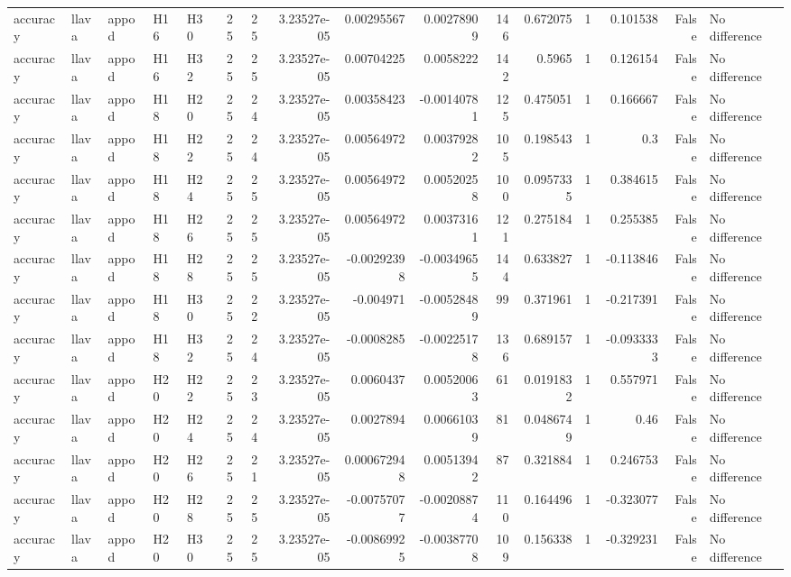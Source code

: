 \begin{longtable}{lllllrrrrrrrrrrl}
accuracy & llava & appod & H16 & H30 & 25 & 25 & 3.23527e-05 & 0.00295567 & 0.00278909 & 146 & 0.672075 & 1 & 0.101538 & False & No difference \\
accuracy & llava & appod & H16 & H32 & 25 & 25 & 3.23527e-05 & 0.00704225 & 0.0058222 & 142 & 0.5965 & 1 & 0.126154 & False & No difference \\
accuracy & llava & appod & H18 & H20 & 25 & 24 & 3.23527e-05 & 0.00358423 & -0.00140781 & 125 & 0.475051 & 1 & 0.166667 & False & No difference \\
accuracy & llava & appod & H18 & H22 & 25 & 24 & 3.23527e-05 & 0.00564972 & 0.00379282 & 105 & 0.198543 & 1 & 0.3 & False & No difference \\
accuracy & llava & appod & H18 & H24 & 25 & 25 & 3.23527e-05 & 0.00564972 & 0.00520258 & 100 & 0.0957335 & 1 & 0.384615 & False & No difference \\
accuracy & llava & appod & H18 & H26 & 25 & 25 & 3.23527e-05 & 0.00564972 & 0.00373161 & 121 & 0.275184 & 1 & 0.255385 & False & No difference \\
accuracy & llava & appod & H18 & H28 & 25 & 25 & 3.23527e-05 & -0.00292398 & -0.00349655 & 144 & 0.633827 & 1 & -0.113846 & False & No difference \\
accuracy & llava & appod & H18 & H30 & 25 & 22 & 3.23527e-05 & -0.004971 & -0.00528489 & 99 & 0.371961 & 1 & -0.217391 & False & No difference \\
accuracy & llava & appod & H18 & H32 & 25 & 24 & 3.23527e-05 & -0.0008285 & -0.00225178 & 136 & 0.689157 & 1 & -0.0933333 & False & No difference \\
accuracy & llava & appod & H20 & H22 & 25 & 23 & 3.23527e-05 & 0.0060437 & 0.00520063 & 61 & 0.0191832 & 1 & 0.557971 & False & No difference \\
accuracy & llava & appod & H20 & H24 & 25 & 24 & 3.23527e-05 & 0.0027894 & 0.00661039 & 81 & 0.0486749 & 1 & 0.46 & False & No difference \\
accuracy & llava & appod & H20 & H26 & 25 & 21 & 3.23527e-05 & 0.000672948 & 0.00513942 & 87 & 0.321884 & 1 & 0.246753 & False & No difference \\
accuracy & llava & appod & H20 & H28 & 25 & 25 & 3.23527e-05 & -0.00757077 & -0.00208874 & 110 & 0.164496 & 1 & -0.323077 & False & No difference \\
accuracy & llava & appod & H20 & H30 & 25 & 25 & 3.23527e-05 & -0.00869925 & -0.00387708 & 109 & 0.156338 & 1 & -0.329231 & False & No difference \\

\end{longtable}
